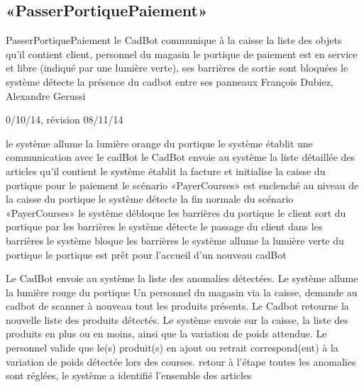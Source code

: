 ﻿%
\subsection[SS:CUD:PP]{«PasserPortiquePaiement»}

\startCU
\nom PasserPortiquePaiement
\but le CadBot communique à la caisse la liste des objets qu'il contient
\acteur client, personnel du magasin
\precondition le portique de paiement est en service et libre (indiqué par une lumière verte), ses barrières de sortie sont bloquées
\declenchement le système détecte la présence du cadbot entre ses panneaux
\auteur François Dubiez, Alexandre Gerussi
\date 30/10/14, révision 08/11/14

\nominal %
\startnominal
\etape le système allume la lumière orange du portique
 le système établit une communication avec le cadBot
 le CadBot envoie au système la liste détaillée des articles qu'il contient
 le système établit la facture et initialise la caisse du portique pour le paiement
\etape le scénario «PayerCourses» est enclenché au niveau de la caisse du portique
\etape le système détecte la fin normale du scénario «PayerCourses»
\etape le système débloque les barrières du portique
\etape le client sort du portique par les barrières
 le système détecte le passage du client dans les barrières
 le système bloque les barrières
\etape le système allume la lumière verte du portique
\stopnominal
\postcondition le portique est prêt pour l'accueil d'un nouveau cadBot

\alternatifs %

  \etape Le CadBot envoie au système la liste des anomalies détectées.
  \etape Le système allume la lumière rouge du portique
  \etape Un personnel du magasin via la caisse, demande au cadbot de scanner à nouveau tout les produits présents.
  \etape Le Cadbot retourne la nouvelle liste des produits détectés.
  \etape Le système envoie sur la caisse, la liste des produits en plus ou en moins, ainsi que la variation de poids attendue.
   Le personnel valide que le(s) produit(s) en ajout ou retrait correspond(ent) à la variation de poids détectée lors des courses.
  \etape retour à l'étape 
\stopcondition
\postcondition toutes les anomalies sont réglées, le système a identifié l'ensemble des articles
\stopalternatif

